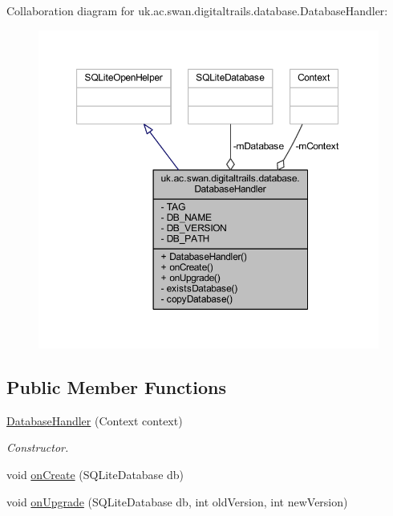Collaboration diagram for uk.\+ac.\+swan.\+digitaltrails.\+database.\+Database\+Handler\+:
\nopagebreak
\begin{figure}[H]
\begin{center}
\leavevmode
\includegraphics[width=350pt]{classuk_1_1ac_1_1swan_1_1digitaltrails_1_1database_1_1_database_handler__coll__graph}
\end{center}
\end{figure}
\subsection*{Public Member Functions}
\begin{DoxyCompactItemize}
\item 
\hyperlink{classuk_1_1ac_1_1swan_1_1digitaltrails_1_1database_1_1_database_handler_a5c8338785e79a850539092be5c10f40d}{Database\+Handler} (Context context)
\begin{DoxyCompactList}\small\item\em Constructor. \end{DoxyCompactList}\item 
void \hyperlink{classuk_1_1ac_1_1swan_1_1digitaltrails_1_1database_1_1_database_handler_a8213ee71c57c792098a32af1b9ce6100}{on\+Create} (S\+Q\+Lite\+Database db)
\item 
void \hyperlink{classuk_1_1ac_1_1swan_1_1digitaltrails_1_1database_1_1_database_handler_af96f43c6beffbbea74b4bfb901476f42}{on\+Upgrade} (S\+Q\+Lite\+Database db, int old\+Version, int new\+Version)
\end{DoxyCompactItemize}
